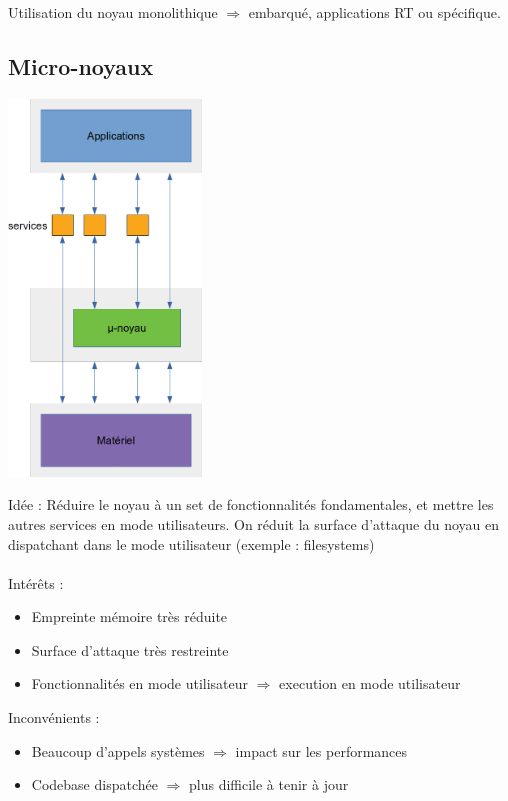 \documentclass[10pt]{article}
\begin{document}
Utilisation du noyau monolithique $\Rightarrow$ embarqué, applications RT ou
spécifique.

\subsection{Micro-noyaux}

\begin{center}
  \includegraphics[height=10cm]{pics/cours1/cours1_micro.png}
\end{center}
Idée : Réduire le noyau à un set de fonctionnalités fondamentales, et mettre les
autres services en mode utilisateurs. On réduit la surface d'attaque du
noyau en dispatchant dans le mode utilisateur (exemple : filesystems)\\\\
Intérêts :
\begin{itemize}
  \item Empreinte mémoire très réduite
  \item Surface d'attaque très restreinte
  \item Fonctionnalités en mode utilisateur $\Rightarrow$ execution en mode utilisateur
\end{itemize}
Inconvénients :
\begin{itemize}
  \item Beaucoup d'appels systèmes $\Rightarrow$ impact sur les performances
  \item Codebase dispatchée $\Rightarrow$ plus difficile à tenir à jour
\end{itemize}
\end{document}
